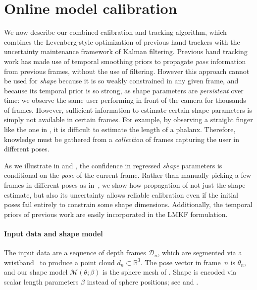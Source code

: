 

\section{Online model calibration}
\label{sec:technical}

We now describe our combined calibration and tracking algorithm, which combines the Levenberg-style optimization of previous hand trackers with the uncertainty maintenance framework of Kalman filtering.   Previous hand tracking work has made use of temporal smoothing priors to propagate {\em pose} information from previous frames, without the use of filtering.  However this approach cannot be used for {\em shape} because it is so weakly constrained in any given frame, and because its temporal prior is so strong, as shape parameters are \emph{persistent} over time: we observe the same user performing in front of the camera for thousands of frames. However, sufficient information to estimate certain shape parameters is simply not available in certain frames. For example, by observing a straight finger like the one in , it is difficult to estimate the length of a phalanx. Therefore, knowledge must be 
gathered from a \emph{collection} of frames capturing the user in different poses. 

As we illustrate in  and , the confidence in regressed \emph{shape} parameters is conditional on the \emph{pose} of the current frame.
Rather than manually picking a few frames in different poses as in~\cite{taylor2016joint}, we show how propagation of not just the shape estimate, but also its uncertainty allows reliable calibration even if the initial poses fail entirely to constrain some shape dimensions.  Additionally, the temporal priors of previous work are easily incorporated in the LMKF formulation.




\paragraph{Input data and shape model}
The input data are a sequence of depth frames $\mathcal{D}_n$, which are segmented via a wristband~\cite{htrack} to produce a point cloud $d_n \subset \mathbb R^3$.   The pose vector in frame~$n$ is $\theta_n$, and our shape model $\mathcal{M}(\theta; \beta)$ is the sphere mesh of .   Shape is encoded via scalar length parameters $\beta$ instead of sphere positions; see  and \cite{edoardo}.

